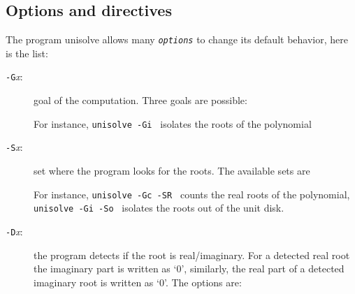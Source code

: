 \documentclass{article}
\begin{document}
\subsection*{Options and directives}
The program unisolve allows many {\tt \em options} to change
its default behavior,
here is the list:
\begin{description}
  \item[{\tt -G}{\em x}:] goal of the computation. Three goals are possible:
   For instance, {\tt unisolve -Gi } isolates the roots of the polynomial
   \item[{\tt -S}{\em x}:] set where the program looks for the roots.
       The available sets are
    For instance,
   {\tt unisolve -Gc -SR } counts the real roots of the polynomial,
   {\tt unisolve -Gi -So } isolates the roots out of the unit disk.
   \item[{\tt -D}{\em x}:] the program detects if the root is real/imaginary.
    For a detected real root the imaginary part is written as `0',
    similarly, the real part of a detected imaginary root is written as `0'.
   The options are:


\end{description}
\end{document}
